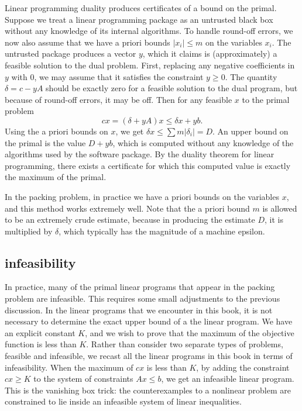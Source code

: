 Linear programming duality produces certificates of a bound
on the primal.  Suppose we treat a linear programming package as
an untrusted 
black box without any knowledge of its internal algorithms.
To handle round-off errors, we now also assume that we have
a priori bounds $|x_i| \le m$ on the variables $x_i$.
The untrusted package produces a vector $y$, which it claims
is (approximately) a feasible solution to the dual problem.  
First, replacing
any negative coefficients in $y$ with $0$, we may assume that
it satisfies the constraint $y\ge 0$.  The quantity $\delta = c - y A$
should be exactly zero for a feasible solution to the dual program, but
because of round-off errors, it may be  off.  
Then for any feasible $x$ to the primal problem
   $$
   c x = (\delta + y A)  x \le \delta  x + y b.
   $$
Using the a priori bounds on $x$, we get $\delta x\le \sum 
m|\delta_i|=D$.  An upper bound on the primal is the value
$D + y b$, which is computed without any knowledge of the
algorithms used by the software package.  By the duality theorem
for linear programming, there exists a certificate for which this
computed value is exactly the maximum of the primal.

In the packing problem, in practice we have a priori bounds
on the variables $x$, and this method works extremely well.  Note
that the a priori bound $m$ is allowed to be an extremely crude estimate,
because in producing the estimate $D$, it is multiplied by $\delta$,
which typically has the magnitude of a machine epsilon.

\subsection{infeasibility}


In practice, many of the primal linear programs that appear
in the packing problem are infeasible.  This requires
some small adjustments to the previous discussion.   In the
linear programs that we encounter in this book, it is not
necessary to determine the exact upper bound of a the linear program.
We have an explicit constant $K$, and we wish to prove that
the maximum of the objective function is less than $K$.
Rather
than consider two separate
types of problems, feasible and infeasible, we recast all the linear
programs in this book in terms of infeasibility.
When the maximum of $c x$ is less than $K$, by
adding the constraint $c x\ge K$ to the system of constraints
$A x\le b$,  we get an infeasible linear program.
This is the vanishing box trick:  the counterexamples to a nonlinear
problem are constrained to lie inside an infeasible system of linear
inequalities.


